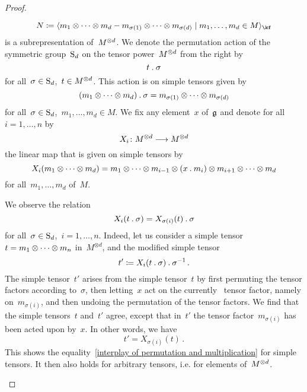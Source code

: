 \begin{proof}
\begin{enumerate}
      \[
        N
        \defined
        \gen{
          m_1 \tensor \dotsb \tensor m_d
          - m_{\sigma(1)} \tensor \dotsb \tensor m_{\sigma(d)}
        \suchthat
          m_1, \dotsc, m_d \in M
        }_{\kf}
      \]
      is a subrepresentation of~$M^{\otimes d}$.
      We denote the permutation action of the symmetric group~$\operatorname{S}_d$ on the tensor power~$M^{\otimes d}$ from the right by
      \[
        t \mathbin{.} \sigma
      \]
      for all~$\sigma \in \operatorname{S}_d$,~$t \in M^{\otimes d}$.
      This action is on simple tensors given by
      \[
        (m_1 \otimes \dotsb \otimes m_d) \mathbin{.} \sigma
        =
        m_{\sigma(1)} \otimes \dotsb \otimes m_{\sigma(d)}
      \]
      for all~$\sigma \in \operatorname{S}_d$,~$m_1, \dotsc, m_d \in M$.
      We fix any element~$x$ of~$\mathfrak{g}$ and denote for all~$i = 1, \dotsc, n$ by
      \[
        X_i
        \colon
        M^{\tensor d}
        \to
        M^{\tensor d}
      \]
      the linear map that is given on simple tensors by
      \[
        X_i(m_1 \otimes \dotsb \otimes m_d)
        =
        m_1 \otimes \dotsb \otimes m_{i-1}
        \otimes (x \mathbin{.} m_i)
        \otimes m_{i+1} \otimes \dotsb \otimes m_d
      \]
      for all~$m_1, \dotsc, m_d$ of~$M$.
      
      We observe the relation
      \begin{equation}
        \label{interplay of permutation and multiplication}
        X_i( t \mathbin{.} \sigma )
        =
        X_{\sigma(i)}(t) \mathbin{.} \sigma
      \end{equation}
      for all~$\sigma \in \operatorname{S}_d$,~$i = 1, \dotsc, n$.
      Indeed, let us consider a simple tensor~$t = m_1 \otimes \dotsb \otimes m_n$ in~$M^{\otimes d}$, and the modified simple tensor
      \[
        t'
        \coloneqq
        X_i( t \mathbin{.} \sigma) \mathbin{.} \sigma^{-1} \,.
      \]
      The simple tensor~$t'$ arises from the simple tensor~$t$ by first permuting the tensor factors according to~$\sigma$, then letting~$x$ act on the currently~ tensor factor, namely on~$m_{\sigma(i)}$, and then undoing the permutation of the tensor factors.
      We find that the simple tensors~$t$ and~$t'$ agree, except that in~$t'$ the tensor factor~$m_{\sigma(i)}$ has been acted upon by~$x$.
      In other words, we have
      \[
        t' = X_{\sigma(i)}(t) \,.
      \]
      This shows the equality~\eqref{interplay of permutation and multiplication} for simple tensors.
      It then also holds for arbitrary tensors, i.e. for elements of~$M^{\otimes d}$.
      

\end{enumerate}
\end{proof}
